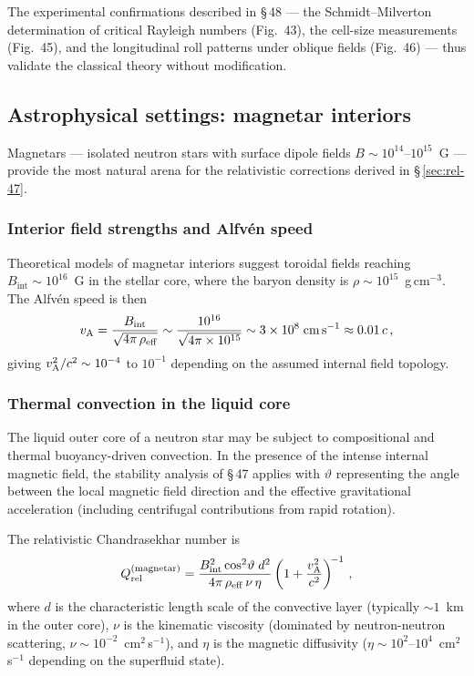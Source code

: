 The experimental confirmations described in \S\,48 --- the
Schmidt--Milverton determination of critical Rayleigh numbers
(Fig.~43), the cell-size measurements (Fig.~45), and the longitudinal
roll patterns under oblique fields (Fig.~46) --- thus validate the
classical theory without modification.

\subsection{Astrophysical settings: magnetar interiors}
\label{subsec:rel-48-magnetars}

Magnetars --- isolated neutron stars with surface dipole fields
$B \sim 10^{14}$--$10^{15}$~G --- provide the most natural arena for
the relativistic corrections derived in \S\,\ref{sec:rel-47}.

\subsubsection{Interior field strengths and Alfv\'en speed}

Theoretical models of magnetar interiors suggest toroidal fields
reaching $B_{\mathrm{int}} \sim 10^{16}$~G in the stellar core, where
the baryon density is $\rho \sim 10^{15}$~g\,cm$^{-3}$.  The Alfv\'en
speed is then
\begin{equation}
  v_{\mathrm{A}}
  = \frac{B_{\mathrm{int}}}{\sqrt{4\pi\,\rho_{\mathrm{eff}}}}
  \sim \frac{10^{16}}{\sqrt{4\pi \times 10^{15}}}
  \sim 3 \times 10^{8}\;\text{cm\,s}^{-1}
  \approx 0.01\,c\,,
  \label{eq:rel-vA-magnetar}
\end{equation}
giving $v_{\mathrm{A}}^{2}/c^{2} \sim 10^{-4}$ to $10^{-1}$ depending on the
assumed internal field topology.

\subsubsection{Thermal convection in the liquid core}

The liquid outer core of a neutron star may be subject to compositional
and thermal buoyancy-driven convection.  In the presence of the
intense internal magnetic field, the stability analysis of \S\,47
applies with $\vartheta$ representing the angle between the local
magnetic field direction and the effective gravitational acceleration
(including centrifugal contributions from rapid rotation).

The relativistic Chandrasekhar number is
\begin{equation}
  Q_{\mathrm{rel}}^{\mathrm{(magnetar)}}
  = \frac{B_{\mathrm{int}}^{2}\cos^{2}\!\vartheta\;d^{2}}
         {4\pi\,\rho_{\mathrm{eff}}\,\nu\,\eta}
    \left(1 + \frac{v_{\mathrm{A}}^{2}}{c^{2}}\right)^{\!-1}\,,
  \label{eq:rel-Q-magnetar}
\end{equation}
where $d$ is the characteristic length scale of the convective layer
(typically $\sim 1$~km in the outer core), $\nu$ is the kinematic
viscosity (dominated by neutron-neutron scattering,
$\nu \sim 10^{-2}$~cm$^{2}$\,s$^{-1}$), and $\eta$ is the magnetic
diffusivity ($\eta \sim 10^{2}$--$10^{4}$~cm$^{2}$\,s$^{-1}$ depending
on the superfluid state).

